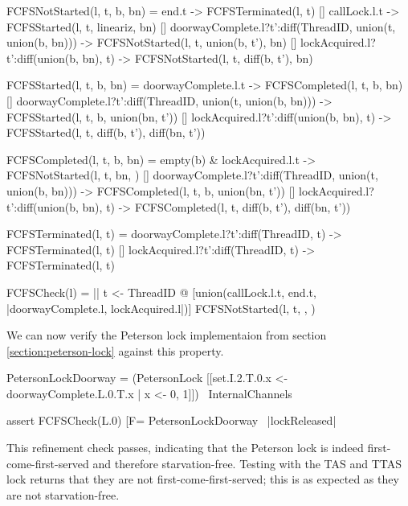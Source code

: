 \begin{cspm}[caption={The CSP specification for first-come-first-served}, label={CSP:FCFS}]
  FCFSNotStarted(l, t, b, bn) = 
     end.t -> FCFSTerminated(l, t)
  [] callLock.l.t -> FCFSStarted(l, t, lineariz, bn)
  [] doorwayComplete.l?t':diff(ThreadID, union({t}, union(b, bn))) -> FCFSNotStarted(l, t, union(b, {t'}), bn)
  [] lockAcquired.l?t':diff(union(b, bn), {t}) -> FCFSNotStarted(l, t, diff(b, {t'}), bn)


FCFSStarted(l, t, b, bn) = 
     doorwayComplete.l.t -> FCFSCompleted(l, t, b, bn)
  [] doorwayComplete.l?t':diff(ThreadID, union({t}, union(b, bn))) -> FCFSStarted(l, t, b, union(bn, {t'}))
  [] lockAcquired.l?t':diff(union(b, bn), {t}) -> FCFSStarted(l, t, diff(b, {t'}), diff(bn, {t'}))

FCFSCompleted(l, t, b, bn) = 
     empty(b) & lockAcquired.l.t -> FCFSNotStarted(l, t, bn, {})
  [] doorwayComplete.l?t':diff(ThreadID, union({t}, union(b, bn))) -> FCFSCompleted(l, t, b, union(bn, {t'}))
  [] lockAcquired.l?t':diff(union(b, bn), {t}) -> FCFSCompleted(l, t, diff(b, {t'}), diff(bn, {t'}))

FCFSTerminated(l, t) = 
     doorwayComplete.l?t':diff(ThreadID, {t}) -> FCFSTerminated(l, t)
  [] lockAcquired.l?t':diff(ThreadID, {t}) -> FCFSTerminated(l, t)

FCFSCheck(l) = 
  || t <- ThreadID @ [union({callLock.l.t, end.t}, {|doorwayComplete.l, lockAcquired.l|})]
        FCFSNotStarted(l, t, {}, {})
\end{cspm}

We can now verify the Peterson lock implementaion from section \ref{section:peterson-lock} against this property.

\begin{cspm}
PetersonLockDoorway = 
  (PetersonLock 
    [[set.I.2.T.0.x <- doorwayComplete.L.0.T.x | x <- {0, 1}]]) \ InternalChannels

assert FCFSCheck(L.0) [F= PetersonLockDoorway \ {|lockReleased|}
\end{cspm}

This refinement check passes, indicating that the Peterson lock is indeed first-come-first-served and therefore starvation-free. Testing with the TAS and TTAS lock returns that they are not first-come-first-served; this is as expected as they are not starvation-free.



